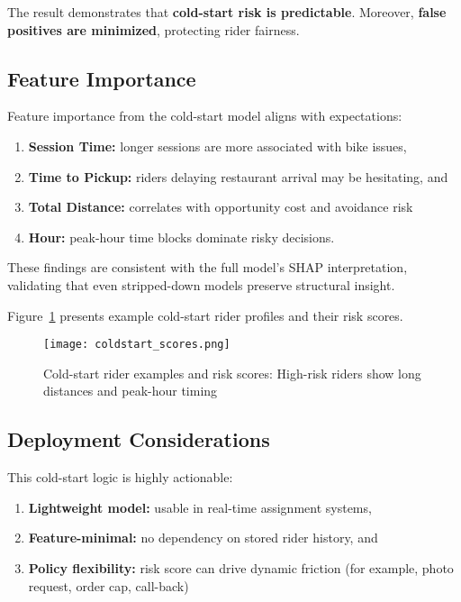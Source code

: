 \documentclass[12pt,letterpaper]{article}
\begin{document}
The result demonstrates that \textbf{cold-start risk is predictable}. Moreover, \textbf{false positives are minimized}, protecting rider fairness.

\subsection{Feature Importance}

Feature importance from the cold-start model aligns with expectations:

\begin{enumerate}
    \item \textbf{Session Time:} longer sessions are more associated with bike issues,
    \item \textbf{Time to Pickup:} riders delaying restaurant arrival may be hesitating, and
    \item \textbf{Total Distance:} correlates with opportunity cost and avoidance risk
    \setcounter{enumi}{3}
    \item \textbf{Hour:} peak-hour time blocks dominate risky decisions.
\end{enumerate}

These findings are consistent with the full model's SHAP interpretation, validating that even stripped-down models preserve structural insight.

Figure~\ref{fig:coldstart_examples} presents example cold-start rider profiles and their risk scores.

\begin{figure}[H]
\centering
\texttt{[image: coldstart\_scores.png]}
\caption{Cold-start rider examples and risk scores: High-risk riders show long distances and peak-hour timing}
\label{fig:coldstart_examples}
\end{figure}

\subsection{Deployment Considerations}

This cold-start logic is highly actionable:

\begin{enumerate}
    \item \textbf{Lightweight model:} usable in real-time assignment systems,
    \item \textbf{Feature-minimal:} no dependency on stored rider history, and
    \item \textbf{Policy flexibility:} risk score can drive dynamic friction (for example, photo request, order cap, call-back)
\end{enumerate}
\end{document}
